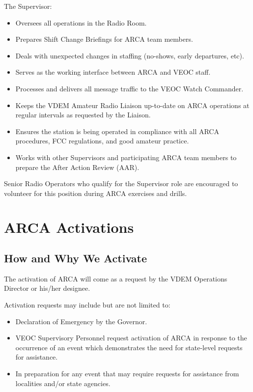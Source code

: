 \documentclass[pdflatex,letterpaper,twoside,12pt]{book}
\begin{document}
The Supervisor:

\begin{itemize}
	\item Oversees all operations in the Radio Room.
	\item Prepares Shift Change Briefings for ARCA team members.
	\item Deals with unexpected changes in staffing (no-shows, early departures, etc).
	\item Serves as the working interface between ARCA and VEOC staff.
	\item Processes and delivers all message traffic to the VEOC Watch Commander.
	\item Keeps the VDEM Amateur Radio Liaison up-to-date on ARCA operations at regular intervals as requested by the Liaison.
	\item Ensures the station is being operated in compliance with all ARCA procedures, FCC regulations, and good amateur practice.
	\item Works with other Supervisors and participating ARCA team members to prepare the After Action Review (AAR).
\end{itemize}

Senior Radio Operators who qualify for the Supervisor role are encouraged to volunteer for this position during ARCA exercises and drills.


\chapter{ARCA Activations}

\section{How and Why We Activate}

The activation of ARCA will come as a request by the VDEM Operations Director or his/her designee.

Activation requests may include but are not limited to:

\begin{itemize}
	\item Declaration of Emergency by the Governor.
	\item VEOC Supervisory Personnel request activation of ARCA in response to the occurrence of an event which demonstrates the need for state-level requests for assistance.
	\item In preparation for any event that may require requests for assistance from localities and/or state agencies.
\end{itemize}
\end{document}
